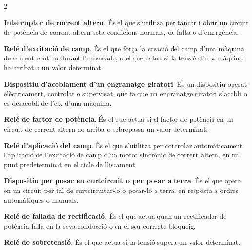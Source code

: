 \begin{multicols}{2}
\begin{list}{}
		\item[\textbf{52}]   
		\textbf{Interruptor de corrent altern}. És
		el que s'utilitza per tancar i obrir un circuit de potència de corrent altern sota condicions
		normals, de falta o d'emergència.
		
		\item[\textbf{53}]  
		\textbf{Relé d'excitació de camp}. És el
		que força la creació del camp d'una màquina de corrent continu
		durant l'arrencada, o el que actua si la tensió d'una màquina ha
		arribat a un valor determinat.
		
		\item[\textbf{54}]  
		\textbf{Dispositiu d'acoblament d'un engranatge giratori}. És un dispositiu operat elèctricament, controlat o supervisat, que fa que un engranatge giratori
		s'acobli o es desacobli de l'eix d'una màquina.
		
		\item[\textbf{55}]   
		\textbf{Relé de factor de potència}. És el que actua si el factor de potència en un circuit de corrent altern no arriba o
		sobrepassa un valor determinat.
		
		\item[\textbf{56}]   
		\textbf{Relé d'aplicació del camp}.
		És el que s'utilitza per controlar automàticament l'aplicació de l'excitació de camp d'un
		motor sincrònic de corrent altern, en un punt predeterminat en el cicle de lliscament.
		
		\item[\textbf{57}]  
		\textbf{Dispositiu per posar en  curtcircuit o per posar a terra}. És el que
		opera en un circuit per tal de curtcircuitar-lo  o
		posar-lo a terra, en resposta a ordres automàtiques o manuals.
		
		\item[\textbf{58}]   
		\textbf{Relé de fallada de rectificació}. És el que actua quan un rectificador de potència falla en la seva conducció o en el seu correcte bloqueig.
		
		\item[\textbf{59}]   
		\textbf{Relé de sobretensió}. És el que
		actua si la tensió supera un valor determinat.
		

\end{list}
\end{multicols}
